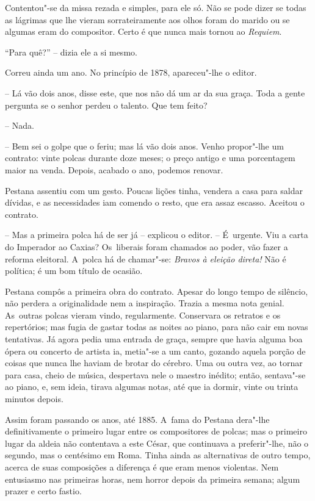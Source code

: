 Contentou"-se da missa rezada e simples, para ele só. Não se pode dizer
se todas as lágrimas que lhe vieram sorrateiramente aos olhos foram do
marido ou se algumas eram do compositor. Certo é que nunca mais tornou
ao \emph{Requiem}.

``Para quê?'' -- dizia ele a si mesmo.

Correu ainda um ano. No princípio de 1878, apareceu"-lhe o editor.

-- Lá vão dois anos, disse este, que nos não dá um ar da sua graça. Toda
a gente pergunta se o senhor perdeu o talento. Que tem feito?

-- Nada.

-- Bem sei o golpe que o feriu; mas lá vão dois anos. Venho propor"-lhe
um contrato: vinte polcas durante doze meses; o preço antigo e uma
porcentagem maior na venda. Depois, acabado o ano, podemos renovar.

Pestana assentiu com um gesto. Poucas lições tinha, vendera a casa para
saldar dívidas, e as necessidades iam comendo o resto, que era assaz
escasso. Aceitou o contrato.

-- Mas a primeira polca há de ser já -- explicou o editor. -- É~urgente.
Viu a carta do Imperador ao Caxias? Os~liberais foram chamados ao poder,
vão fazer a reforma eleitoral. A~polca há de chamar"-se: \emph{Bravos à
eleição direta!} Não é política; é um bom título de ocasião.

Pestana compôs a primeira obra do contrato. Apesar do longo tempo de
silêncio, não perdera a originalidade nem a inspiração. Trazia a mesma
nota genial. As~outras polcas vieram vindo, regularmente. Conservara os
retratos e os repertórios; mas fugia de gastar todas as noites ao piano,
para não cair em novas tentativas. Já agora pedia uma entrada de graça,
sempre que havia alguma boa ópera ou concerto de artista ia, metia"-se a
um canto, gozando aquela porção de coisas que nunca lhe haviam de brotar
do cérebro. Uma ou outra vez, ao tornar para casa, cheio de música,
despertava nele o maestro inédito; então, sentava"-se ao piano, e, sem
ideia, tirava algumas notas, até que ia dormir, vinte ou trinta minutos
depois.

Assim foram passando os anos, até 1885. A~fama do Pestana dera"-lhe
definitivamente o primeiro lugar entre os compositores de polcas; mas o
primeiro lugar da aldeia não contentava a este César, que continuava a
preferir"-lhe, não o segundo, mas o centésimo em Roma. Tinha ainda as
alternativas de outro tempo, acerca de suas composições a diferença é
que eram menos violentas. Nem entusiasmo nas primeiras horas, nem horror
depois da primeira semana; algum prazer e certo fastio.

